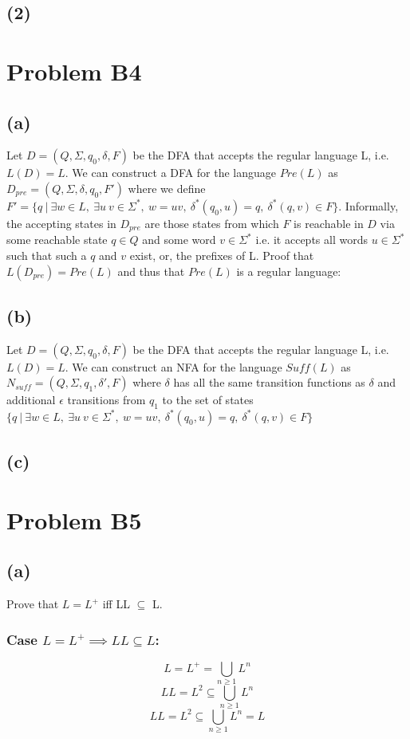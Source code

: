 \documentclass[12pt]{article}
\begin{document}
\subsection*{(2)}

\section*{Problem B4}
\subsection*{(a)}
  Let $D = (Q, \Sigma, q_0, \delta, F)$ be the DFA that accepts the regular
  language L, i.e. $L(D) = L$. We can construct a DFA for the language
  $Pre(L)$ as $D_{pre} = (Q, \Sigma, \delta, q_0, F')$ where we define
  $F' = \{q \:|\: \exists w \in L ,\: \exists u \: v \in \Sigma^* ,\: w=uv
  ,\: \delta^* (q_0, u) = q ,\: \delta^* (q,v) \in F \}$. Informally,
  the accepting states in $D_{pre}$ are those states from which $F$ is
  reachable in $D$ via some reachable state $q \in Q$ and some
  word $v \in \Sigma^*$ i.e. it accepts all words $u \in \Sigma^*$
  such that such a $q$ and $v$ exist, or, the prefixes of L.
  Proof that $L(D_{pre}) = Pre(L)$ and thus that $Pre(L)$ is a regular language:
 
\subsection*{(b)}
  Let $D = (Q, \Sigma, q_0, \delta, F)$ be the DFA that accepts the regular
  language L, i.e. $L(D) = L$. We can construct an NFA for the language
  $Suff(L)$ as $N_{suff} = (Q, \Sigma, q_1, \delta{'}, F)$ where $\delta$
  has all the same transition functions as $\delta$ and additional
  $\epsilon$ transitions from $q_1$ to the set of states
  $\{q \:|\: \exists w \in L ,\: \exists u \: v \in \Sigma^* ,\: w=uv
  ,\: \delta^* (q_0, u) = q ,\: \delta^* (q,v) \in F \}$
\subsection*{(c)}

\section*{Problem B5}
\subsection*{(a)} Prove that $L=L^+$ iff LL $\subseteq$ L.
\subsubsection*{Case $L=L^+ \implies LL \subseteq L$:}
$$L = L^+ = \bigcup\limits_{n\ge1} L^n$$
$$LL = L^2 \subseteq \bigcup\limits_{n\ge1} L^n$$
$$LL = L^2 \subseteq \bigcup\limits_{n\ge1} L^n = L$$
\end{document}
